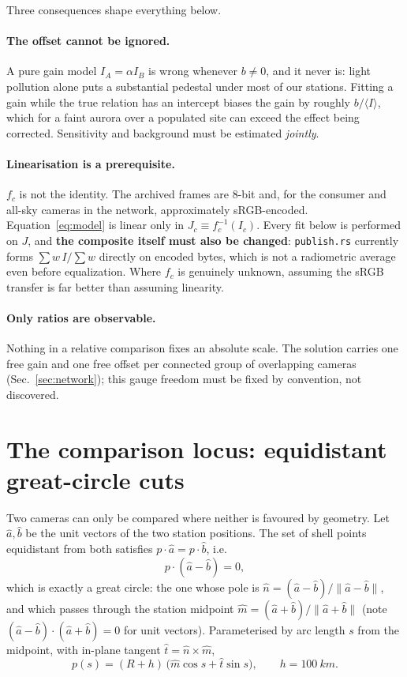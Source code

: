 \documentclass[11pt,a4paper]{article}
\newcommand{\off}{b}
\begin{document}
Three consequences shape everything below.

\paragraph{The offset cannot be ignored.} A pure gain model $I_A = \alpha I_B$
is wrong whenever $\off \neq 0$, and it never is: light pollution alone puts a
substantial pedestal under most of our stations. Fitting a gain while the true
relation has an intercept biases the gain by roughly $\off/\langle I\rangle$,
which for a faint aurora over a populated site can exceed the effect being
corrected. Sensitivity and background must be estimated \emph{jointly}.

\paragraph{Linearisation is a prerequisite.} $f_c$ is not the identity. The
archived frames are 8-bit and, for the consumer and all-sky cameras in the
network, approximately sRGB-encoded. Equation~\eqref{eq:model} is linear only
in $J_c \equiv f_c^{-1}(I_c)$. Every fit below is performed on $J$, and
\textbf{the composite itself must also be changed}: \texttt{publish.rs}
currently forms $\sum w\,I/\sum w$ directly on encoded bytes, which is not a
radiometric average even before equalization. Where $f_c$ is genuinely unknown,
assuming the sRGB transfer is far better than assuming linearity.

\paragraph{Only ratios are observable.} Nothing in a relative comparison fixes
an absolute scale. The solution carries one free gain and one free offset per
connected group of overlapping cameras (Sec.~\ref{sec:network}); this gauge
freedom must be fixed by convention, not discovered.

\section{The comparison locus: equidistant great-circle cuts}

Two cameras can only be compared where neither is favoured by geometry. Let
$\hat a,\hat b$ be the unit vectors of the two station positions. The set of
shell points equidistant from both satisfies $p\cdot\hat a = p\cdot\hat b$,
i.e.
\begin{equation}
  p\cdot(\hat a-\hat b)=0 ,
\end{equation}
which is exactly a great circle: the one whose pole is
$\hat n=(\hat a-\hat b)/\lVert\hat a-\hat b\rVert$, and which passes through the
station midpoint $\hat m=(\hat a+\hat b)/\lVert\hat a+\hat b\rVert$ (note
$(\hat a-\hat b)\cdot(\hat a+\hat b)=0$ for unit vectors). Parameterised by arc
length $s$ from the midpoint, with in-plane tangent
$\hat t=\hat n\times\hat m$,
\begin{equation}
  p(s) = (R+h)\,\bigl(\hat m\cos s + \hat t\sin s\bigr),
  \qquad h=\SI{100}{km}.
  \label{eq:cut}
\end{equation}
\end{document}
